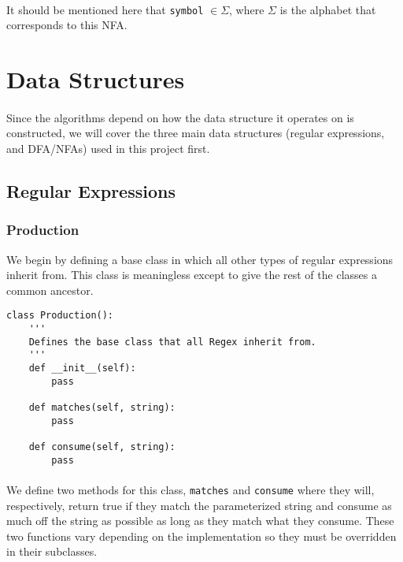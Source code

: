 \documentclass{article}
\begin{document}
\paragraph{} It should be mentioned here that \verb|symbol| $\in \Sigma$, 
where $\Sigma$ is the alphabet that corresponds to this NFA.

\section{Data Structures}
\label{sec:algos}
\paragraph{} Since the algorithms depend on how the data structure it 
operates on is constructed, we will cover the three main data
structures (regular expressions, and DFA/NFAs) used in this project
first.

\subsection{Regular Expressions}
\label{sec:algos:regex}
\subsubsection{Production}
\label{sec:algos:regex:production}
We begin by defining a base class in which all other types of regular
expressions inherit from. This class is meaningless except to give
the rest of the classes a common ancestor.

\begin{verbatim}
class Production():
    '''
    Defines the base class that all Regex inherit from. 
    '''
    def __init__(self):
        pass

    def matches(self, string):
        pass

    def consume(self, string):
        pass
\end{verbatim}

\paragraph{} We define two methods for this class, \verb|matches| 
and \verb|consume| where they will, respectively, return true if they
match the parameterized string and consume as much off the string as
possible as long as they match what they consume. These two functions
vary depending on the implementation so they must be overridden in
their subclasses.
\end{document}

